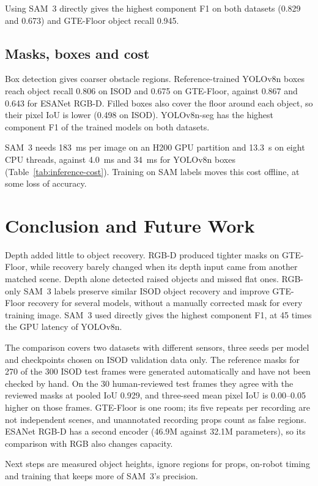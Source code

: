 Using SAM~3 directly gives the highest component F1 on both datasets
(0.829 and 0.673) and GTE-Floor object recall 0.945.


\subsection{Masks, boxes and cost}

Box detection gives coarser obstacle regions. Reference-trained YOLOv8n boxes
reach object recall 0.806 on ISOD and 0.675 on GTE-Floor, against 0.867 and 0.643 for ESANet RGB-D. Filled boxes also cover the floor around
each object, so their pixel IoU is lower (0.498 on ISOD). YOLOv8n-seg has
the highest component F1 of the trained models on both datasets.

SAM~3 needs 183~ms per image on an H200 GPU partition and 13.3~s on
eight CPU threads, against 4.0~ms and 34~ms for YOLOv8n boxes
(Table~\ref{tab:inference-cost}). Training on SAM labels moves this cost offline, at some loss of accuracy.

\section{Conclusion and Future Work}\label{sec:conclusion}

Depth added little to object recovery. RGB-D produced tighter masks
on GTE-Floor, while recovery barely changed when its depth input came
from another matched scene.
Depth alone detected raised objects and missed flat ones. RGB-only SAM~3
labels preserve similar ISOD object recovery and improve GTE-Floor
recovery for several models, without a manually corrected mask for every
training image. SAM~3 used directly gives the highest component F1,
at 45 times the GPU latency of YOLOv8n.

The comparison covers two datasets with different sensors, three seeds per model and checkpoints chosen on ISOD validation data only.
The reference masks for 270 of the 300 ISOD test frames were generated
automatically and have not been checked by hand.
On the 30 human-reviewed test frames they agree with the reviewed masks
at pooled IoU 0.929, and three-seed mean pixel IoU is 0.00--0.05 higher on those frames. GTE-Floor is one room; its five repeats per
recording are not independent scenes, and unannotated recording props
count as false regions. ESANet RGB-D has a second encoder (46.9M against
32.1M parameters), so its comparison with RGB also changes capacity.

Next steps are measured object heights, ignore regions for props,
on-robot timing and training that keeps more of SAM~3's precision.
